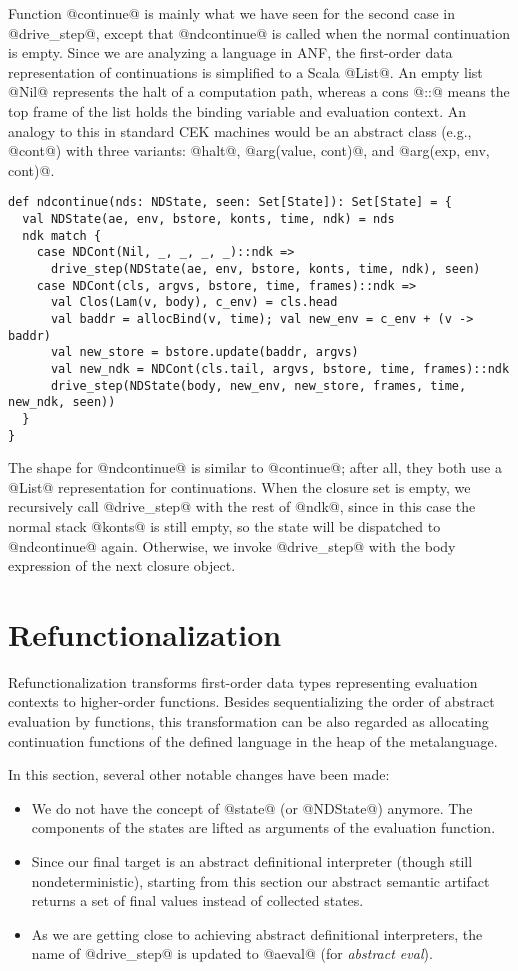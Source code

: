 \documentclass[acmsmall]{acmart}\settopmatter{}
\begin{document}
Function @continue@ is mainly what we have seen for the second case in
@drive_step@, except that @ndcontinue@ is called when
the normal continuation is empty.
Since we are analyzing a language in ANF, the first-order data representation of
continuations is simplified to a Scala @List@.
An empty list @Nil@ represents the halt of a computation path, whereas
a cons @::@ means the top frame of the list holds the binding variable and
evaluation context.
An analogy to this in standard CEK machines would be an abstract class (e.g., @cont@) with
three variants: @halt@, @arg(value, cont)@, and @arg(exp, env, cont)@.

\begin{lstlisting}
def ndcontinue(nds: NDState, seen: Set[State]): Set[State] = {
  val NDState(ae, env, bstore, konts, time, ndk) = nds
  ndk match {
    case NDCont(Nil, _, _, _, _)::ndk =>
      drive_step(NDState(ae, env, bstore, konts, time, ndk), seen)
    case NDCont(cls, argvs, bstore, time, frames)::ndk =>
      val Clos(Lam(v, body), c_env) = cls.head
      val baddr = allocBind(v, time); val new_env = c_env + (v -> baddr)
      val new_store = bstore.update(baddr, argvs)
      val new_ndk = NDCont(cls.tail, argvs, bstore, time, frames)::ndk
      drive_step(NDState(body, new_env, new_store, frames, time, new_ndk, seen))
  }
}
\end{lstlisting}

The shape for @ndcontinue@ is similar to @continue@; after
all, they both use a @List@ representation for continuations.
When the closure set is empty, we recursively call @drive_step@ with the rest
of @ndk@, since in this case the normal stack @konts@ is still empty, so
the state will be dispatched to @ndcontinue@ again.
Otherwise, we invoke @drive_step@ with the body expression of the next closure object.

\section{Refunctionalization} \label{sec:refunc}

Refunctionalization transforms first-order data types representing
evaluation contexts to higher-order functions.
Besides sequentializing the order of abstract evaluation by functions,
this transformation can be also regarded as allocating continuation functions of
the defined language in the heap of the metalanguage.

In this section, several other notable changes have been made:
\begin{itemize}
\item We do not have the concept of @state@ (or @NDState@) anymore.
The components of the states are lifted as arguments of the evaluation
function.
\item Since our final target is an abstract definitional interpreter (though still
nondeterministic), starting from this section our abstract semantic artifact
returns a set of final values instead of collected states.
\item As we are getting close to achieving
abstract definitional interpreters, the name of @drive_step@ is updated to
@aeval@ (for \emph{abstract eval}).
\end{itemize}
\end{document}
